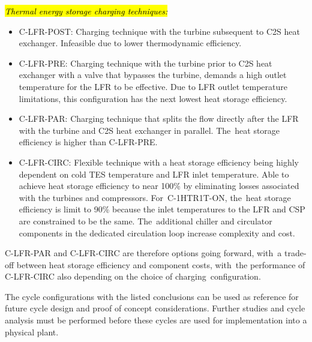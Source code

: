 \documentclass[sustainability,article,accept,moreauthors,pdftex]{Definitions/mdpi}
\begin{document}
\begin{paracol}{2}
\textit{\hl{Thermal energy storage charging techniques:}}
\begin{itemize}
    \item    C-LFR-POST: Charging technique with the turbine subsequent to C2S heat exchanger. Infeasible due to lower thermodynamic efficiency. 
    \item	C-LFR-PRE: Charging technique with the turbine prior to C2S heat exchanger with a valve that bypasses the turbine, demands a high outlet temperature for the LFR to be effective. Due to LFR outlet temperature limitations, this configuration has the next lowest heat storage efficiency.
    \item	C-LFR-PAR: Charging technique that splits the flow directly after the LFR with the turbine and C2S heat exchanger in parallel. The~heat storage efficiency is higher than C-LFR-PRE.
    \item   C-LFR-CIRC: Flexible technique with a heat storage efficiency being highly dependent on cold TES temperature and LFR inlet temperature. Able to achieve heat storage efficiency to near 100\% by eliminating losses associated with the turbines and compressors. For~C-1HTR1T-ON, the~heat storage efficiency is limit to 90\% because the inlet temperatures to the LFR and CSP are constrained to be the same. The~additional chiller and circulator components in the dedicated circulation loop increase complexity and cost. 
\end{itemize}

C-LFR-PAR and C-LFR-CIRC are therefore options going forward, with~a trade-off between heat storage efficiency and component costs, with~the performance of C-LFR-CIRC also depending on the choice of charging~configuration.

The cycle configurations with the listed conclusions can be used as reference for future cycle design and proof of concept considerations. Further studies and cycle analysis must be performed before these cycles are used for implementation into a physical plant. 
\vspace{6pt} 



\end{paracol}
\end{document}
